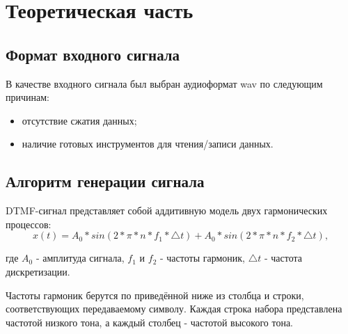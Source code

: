 \chapter{Теоретическая часть} \label{ch1}

\section{Формат входного сигнала}

В качестве входного сигнала был выбран аудиоформат wav по следующим причинам:
\begin{itemize}
	\item отсутствие сжатия данных;
	\item наличие готовых инструментов для чтения/записи данных.
\end{itemize}


\section{Алгоритм генерации сигнала}

DTMF-сигнал представляет собой аддитивную модель двух гармонических процессов:
\begin{equation}
	x(t) = A_{0} * sin(2*\pi*n*f_{1}*\triangle{t}) + A_{0} * sin(2*\pi*n*f_{2}*\triangle{t}),
\end{equation}

где $A_{0}$ - амплитуда сигнала, $f_{1}$ и $f_{2}$ - частоты гармоник, $\triangle{t}$ - частота дискретизации.

Частоты гармоник берутся по приведённой ниже  из столбца и строки, соответствующих передаваемому символу. Каждая строка набора представлена частотой низкого тона, а каждый столбец - частотой высокого тона.

